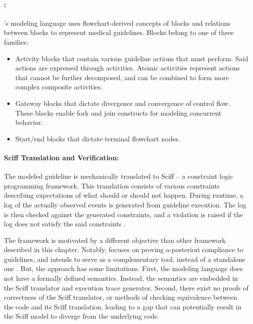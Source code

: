 \paragraph{\GOSPEL{}:}

\GPROVE{}'s modeling language uses flowchart-derived concepts of
blocks and relations between blocks to represent medical guidelines. Blocks belong to one of three families:
\begin{itemize}
  \item Activity blocks that contain various guideline actions that \HCPs{} must perform.
    Said actions are expressed through activities.
    Atomic activities represent actions that cannot be further decomposed, and
    can be combined to form more complex composite activities.
  \item Gateway blocks that dictate divergence and convergence of control flow.
    These blocks enable fork and join constructs for modeling concurrent
    behavior.
  \item Start/end blocks that dictate terminal flowchart nodes.
\end{itemize}

\paragraph{Sciff Translation and Verification:}

The modeled guideline is mechanically translated to Sciff --
a constraint logic programming framework. This translation
consists of various constraints describing expectations of what
should or should not happen. During runtime,
a log of the actually observed events is generated from guideline execution.
The log is then checked against the generated constraints, and a violation is
raised if the log does not satisfy the said constraints \cite{ChesaniBook08}.

The \GPROVE{} framework is motivated by a different objective than other
framework described in this chapter. Notably, \GPROVE{} focuses on proving
a-posteriori compliance to guidelines, and intends to serve as a complementary
tool, instead of a standalone one \cite{BottrighiBook10}. But, the
approach has some limitations.
First, the \GPROVE{} modeling language does not have a formally defined
semantics. Instead, the semantics are embedded in the Sciff translator and
execution trace generator. Second, there exist no proofs of correctness of
the Sciff translator, or methods of checking equivalence between the
\GOSPEL{} code and its Sciff translation, leading to a gap that can
potentially result in the Sciff model to diverge from the underlying \GOSPEL{}
code.

